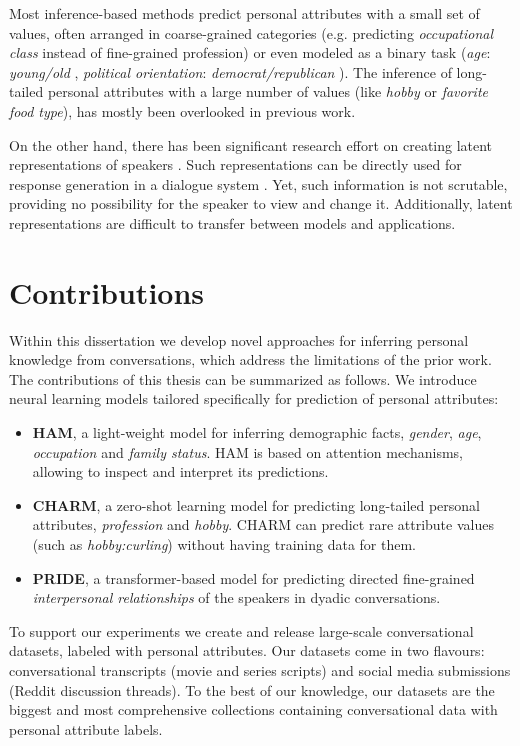 Most inference-based methods predict personal attributes with a small set of values, often arranged in coarse-grained categories (e.g. predicting \textit{occupational class} instead of fine-grained profession) or even modeled as a binary task (\textit{age}: \textit{young/old} \cite{liesenfeld2020predicting}, \textit{political orientation}: \textit{democrat/republican} \cite{preoctiuc2017beyond}). The inference of long-tailed personal attributes with a large number of values (like \textit{hobby} or \textit{favorite food type}), has mostly been overlooked in previous work.

On the other hand, there has been significant research effort on creating latent representations of speakers \cite{li2016persona, AIIDElin11}. Such representations can be directly used for response generation in a dialogue system \cite{zheng2019personalized}. Yet, such information is not scrutable, providing no possibility for the speaker to view and change it. Additionally, latent representations are difficult to transfer between models and applications.

\section{Contributions}

Within this dissertation we develop novel approaches for inferring personal knowledge from conversations, which address the limitations of the prior work. The contributions of this thesis can be summarized as follows. We introduce neural learning models tailored specifically for prediction of personal attributes:
\begin{itemize}
    \item \textbf{HAM}, a light-weight model for inferring demographic facts, \textit{gender}, \textit{age}, \textit{occupation} and \textit{family status}. HAM is based on attention mechanisms, allowing to inspect and interpret its predictions.
    \item \textbf{CHARM}, a zero-shot learning model for predicting long-tailed personal attributes, \textit{profession} and \textit{hobby}. CHARM can predict rare attribute values (such as \textit{hobby:curling}) without having training data for them.
    \item \textbf{PRIDE}, a transformer-based model for predicting directed fine-grained \textit{interpersonal relationships} of the speakers in dyadic conversations.
\end{itemize}

To support our experiments we create and release large-scale conversational datasets, labeled with personal attributes. Our datasets come in two flavours: conversational transcripts (movie and series scripts) and social media submissions (Reddit discussion threads). To the best of our knowledge, our datasets are the biggest and most comprehensive collections containing conversational data with personal attribute labels.

